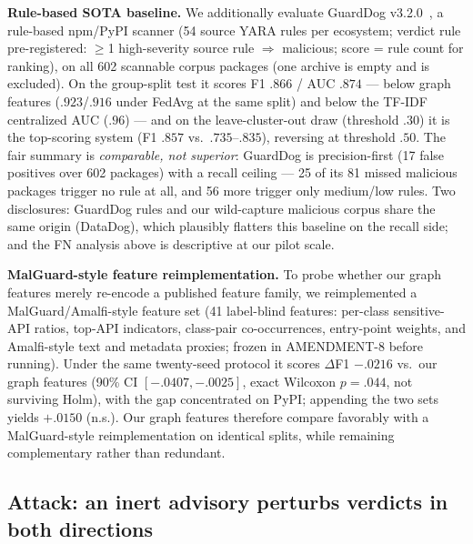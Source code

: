 \documentclass[sigconf,nonacm]{acmart}
\begin{document}
\textbf{Rule-based SOTA baseline.} We additionally evaluate GuardDog
v3.2.0~\cite{guarddog2026}, a rule-based npm/PyPI scanner (54 source YARA
rules per ecosystem; verdict rule pre-registered: $\geq$1 high-severity
source rule $\Rightarrow$ malicious; score = rule count for ranking),
on all 602 scannable corpus packages (one archive is empty and is
excluded). On the group-split test it scores F1 $.866$ / AUC $.874$ ---
below graph features ($.923$/$.916$ under FedAvg at the same split) and
below the TF-IDF centralized AUC ($.96$) --- and on the leave-cluster-out
draw (threshold $.30$) it is the top-scoring system (F1 $.857$ vs.\
$.735$--$.835$), reversing at threshold $.50$. The fair summary is
\emph{comparable, not superior}: GuardDog is precision-first (17 false
positives over 602 packages) with a recall ceiling --- 25 of its 81
missed malicious packages trigger no rule at all, and 56 more trigger
only medium/low rules. Two disclosures: GuardDog rules and our
wild-capture malicious corpus share the same origin (DataDog), which
plausibly flatters this baseline on the recall side; and the FN analysis
above is descriptive at our pilot scale.

\textbf{MalGuard-style feature reimplementation.} To probe whether our
graph features merely re-encode a published feature family, we
reimplemented a MalGuard/Amalfi-style feature set (41 label-blind
features: per-class sensitive-API ratios, top-API indicators,
class-pair co-occurrences, entry-point weights, and Amalfi-style text
and metadata proxies; frozen in AMENDMENT-8 before running). Under the
same twenty-seed protocol it scores $\Delta$F1 $-.0216$ vs.\ our graph
features (90\% CI $[-.0407,-.0025]$, exact Wilcoxon $p{=}.044$, not
surviving Holm), with the gap concentrated on PyPI; appending the two
sets yields $+.0150$ (n.s.). Our graph features therefore compare
favorably with a MalGuard-style reimplementation on identical splits,
while remaining complementary rather than redundant.
\subsection{Attack: an inert advisory perturbs verdicts in both
directions}\label{sec:attack}
\end{document}
